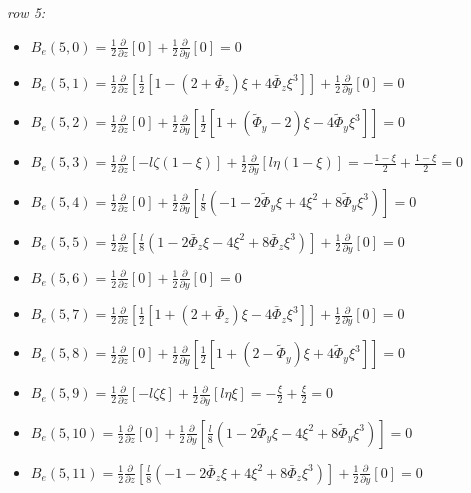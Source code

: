 \documentclass[a4paper,11pt]{article}
\newcommand{\gr}{\textbf}
\begin{document}
\noindent \textit{row 5:}
\begin{itemize}[label=$\gr{-}$, font=\LARGE, font=\color{color1}, topsep = 0.2cm, itemsep=0.2cm]
	\item $B_e(5,0) = \frac{1}{2} \frac{\partial}{\partial z} \left[ 0 \right] + \frac{1}{2} \frac{\partial}{\partial y} \left[ 0 \right] = 0 $
	\item $B_e(5,1) = \frac{1}{2} \frac{\partial}{\partial z} \left[ \frac{1}{2} \left[1 - (2 + \bar{\Phi}_z)\xi + 4\bar{\Phi}_z\xi^3 \right] \right] + \frac{1}{2} \frac{\partial}{\partial y} \left[ 0 \right] = 0$
	\item $B_e(5,2) = \frac{1}{2} \frac{\partial}{\partial z} \left[ 0 \right] + \frac{1}{2} \frac{\partial}{\partial y} \left[ \frac{1}{2} \left[ 1 + (\tilde{\Phi}_y - 2) \xi - 4\tilde{\Phi}_y \xi^3 \right] \right] = 0 $
	\item $B_e(5,3) = \frac{1}{2} \frac{\partial}{\partial z} \left[ -l \zeta (1-\xi) \right] + \frac{1}{2} \frac{\partial}{\partial y} \left[ l \eta (1-\xi) \right] = -\frac{1 - \xi}{2} + \frac{1 - \xi}{2} = 0$
	\item $B_e(5,4) = \frac{1}{2} \frac{\partial}{\partial z} \left[ 0 \right] + \frac{1}{2} \frac{\partial}{\partial y} \left[ \frac{l}{8} \left( -1 - 2\tilde{\Phi}_y \xi + 4 \xi^2 + 8\tilde{\Phi}_y \xi^3 \right) \right] = 0 $
	\item $B_e(5,5) = \frac{1}{2} \frac{\partial}{\partial z} \left[ \frac{l}{8}\left(1 - 2\bar{\Phi}_z\xi - 4\xi^2 + 8\bar{\Phi}_z\xi^3 \right) \right] + \frac{1}{2} \frac{\partial}{\partial y} \left[ 0 \right] = 0 $
	\item $B_e(5,6) = \frac{1}{2} \frac{\partial}{\partial z} \left[ 0 \right] + \frac{1}{2} \frac{\partial}{\partial y} \left[ 0 \right] = 0 $
	\item $B_e(5,7) = \frac{1}{2} \frac{\partial}{\partial z} \left[ \frac{1}{2} \left[1 + (2 + \bar{\Phi}_z)\xi - 4\bar{\Phi}_z\xi^3 \right] \right] + \frac{1}{2} \frac{\partial}{\partial y} \left[ 0 \right] = 0 $
	\item $B_e(5,8) = \frac{1}{2} \frac{\partial}{\partial z} \left[ 0 \right] + \frac{1}{2} \frac{\partial}{\partial y} \left[ \frac{1}{2} \left[ 1 + (2 - \tilde{\Phi}_y) \xi + 4\tilde{\Phi}_y \xi^3 \right] \right] = 0 $
	\item $B_e(5,9) = \frac{1}{2} \frac{\partial}{\partial z} \left[ -l \zeta \xi \right] + \frac{1}{2} \frac{\partial}{\partial y} \left[ l \eta \xi \right] = -\frac{\xi}{2} + \frac{\xi}{2} = 0 $
	\item $B_e(5,10) = \frac{1}{2} \frac{\partial}{\partial z} \left[ 0 \right] + \frac{1}{2} \frac{\partial}{\partial y} \left[ \frac{l}{8} \left( 1 - 2\tilde{\Phi}_y \xi - 4 \xi^2 + 8\tilde{\Phi}_y \xi^3 \right) \right] = 0$
	\item $B_e(5,11) = \frac{1}{2} \frac{\partial}{\partial z} \left[ \frac{l}{8}\left( -1 - 2\bar{\Phi}_z\xi + 4\xi^2 + 8\bar{\Phi}_z\xi^3 \right) \right] + \frac{1}{2} \frac{\partial}{\partial y} \left[ 0 \right] = 0 $
\end{itemize}
\end{document}
